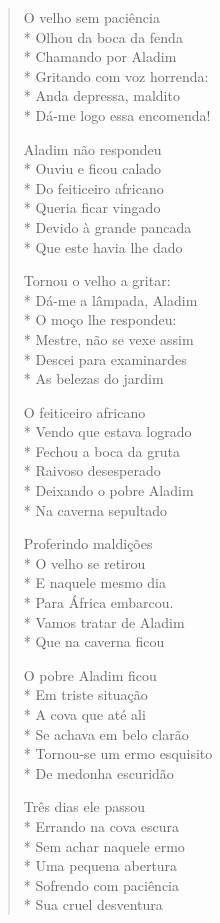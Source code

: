 \begin{verse}
O velho sem paciência\\*
Olhou da boca da fenda\\*
Chamando por Aladim\\*
Gritando com voz horrenda:\\*
Anda depressa, maldito\\*
Dá-me logo essa encomenda!

Aladim não respondeu\\*
Ouviu e ficou calado\\*
Do feiticeiro africano\\*
Queria ficar vingado\\*
Devido à grande pancada\\*
Que este havia lhe dado

Tornou o velho a gritar:\\*
Dá-me a lâmpada, Aladim\\*
O moço lhe respondeu:\\*
Mestre, não se vexe assim\\*
Descei para examinardes\\*
As belezas do jardim

O feiticeiro africano\\*
Vendo que estava logrado\\*
Fechou a boca da gruta\\*
Raivoso desesperado\\*
Deixando o pobre Aladim\\*
Na caverna sepultado

Proferindo maldições\\*
O velho se retirou\\*
E naquele mesmo dia\\*
Para África embarcou.\\*
Vamos tratar de Aladim\\*
Que na caverna ficou

O pobre Aladim ficou\\*
Em triste situação\\*
A cova que até ali\\*
Se achava em belo clarão\\*
Tornou-se um ermo esquisito\\*
De medonha escuridão

Três dias ele passou\\*
Errando na cova escura\\*
Sem achar naquele ermo\\*
Uma pequena abertura\\*
Sofrendo com paciência\\*
Sua cruel desventura


\end{verse}

